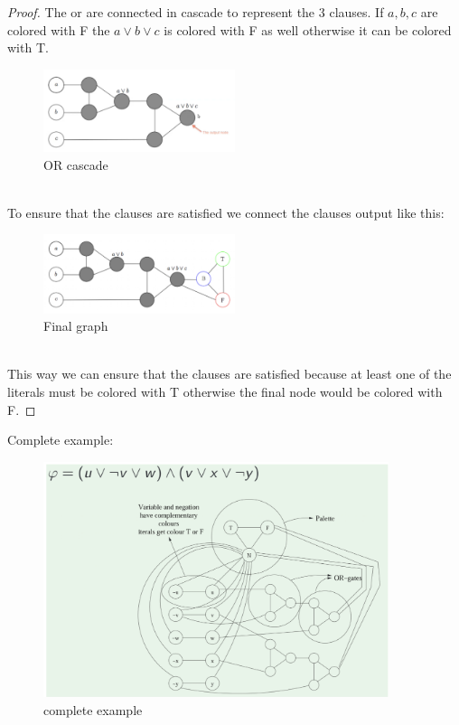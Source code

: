 \documentclass[12pt]{article}
\begin{document}
\begin{proof}
The or are connected in cascade to represent the 3 clauses. If $a,b,c$ are colored with F the $a\vee b\vee c$ is colored with F as well otherwise it can be colored with T. 
\begin{figure}[h]
  \centering
  \includegraphics[width=0.5\textwidth]{img/3-coloring-3g.png}
  \caption{OR cascade}
\end{figure}
\\
To ensure that the clauses are satisfied we connect the clauses output like this:
\\
\begin{figure}[h]
  \centering
  \includegraphics[width=0.5\textwidth]{img/3-coloring-4g.png}
  \caption{Final graph}
\end{figure}
\\
This way we can ensure that the clauses are satisfied because at least one of the literals must be colored with T otherwise the final node would be colored with F.
\end{proof}
Complete example:\\
\begin{figure}[h]
  \centering
  \includegraphics[width=0.9\textwidth]{img/3-coloring-example.png}
  \caption{complete example}
\end{figure}
\end{document}
